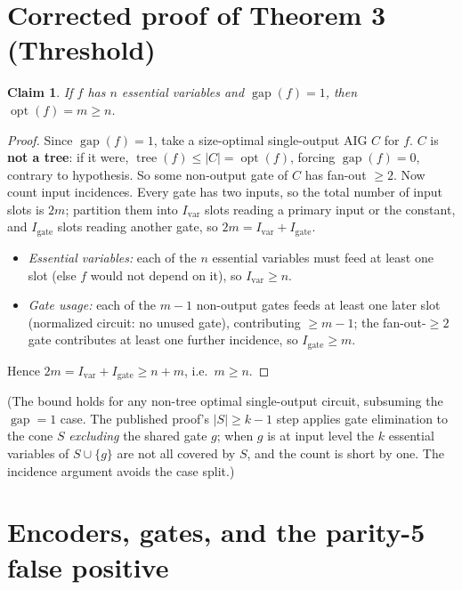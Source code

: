 \documentclass[11pt]{article}
\DeclareMathOperator{\opt}{opt}
\DeclareMathOperator{\tree}{tree}
\DeclareMathOperator{\gapop}{gap}
\theoremstyle{plain}
\newtheorem*{claim}{Claim}
\begin{document}
\nocite{khrapchenko1971,kojevnikov2009,tools}



\appendix

\section{Corrected proof of Theorem 3 (Threshold)}
\label{app:thm3}

\begin{claim}
If $f$ has $n$ essential variables and $\gapop(f) = 1$, then $\opt(f) = m \ge n$.
\end{claim}

\begin{proof}
Since $\gapop(f) = 1$, take a size-optimal single-output AIG $C$ for $f$. $C$ is \textbf{not a
tree}: if it were, $\tree(f) \le |C| = \opt(f)$, forcing $\gapop(f) = 0$, contrary to hypothesis. So
some non-output gate of $C$ has fan-out $\ge 2$. Now count input incidences. Every gate has two
inputs, so the total number of input slots is $2m$; partition them into $I_{\mathrm{var}}$ slots
reading a primary input or the constant, and $I_{\mathrm{gate}}$ slots reading another gate, so
$2m = I_{\mathrm{var}} + I_{\mathrm{gate}}$.

\begin{itemize}
  \item \emph{Essential variables:} each of the $n$ essential variables must feed at least one slot
  (else $f$ would not depend on it), so $I_{\mathrm{var}} \ge n$.
  \item \emph{Gate usage:} each of the $m - 1$ non-output gates feeds at least one later slot
  (normalized circuit: no unused gate), contributing $\ge m - 1$; the fan-out-$\ge 2$ gate
  contributes at least one further incidence, so $I_{\mathrm{gate}} \ge m$.
\end{itemize}

Hence $2m = I_{\mathrm{var}} + I_{\mathrm{gate}} \ge n + m$, i.e.\ $m \ge n$.
\end{proof}

\noindent
(The bound holds for any non-tree optimal single-output circuit, subsuming the $\gapop = 1$ case.
The published proof's $|S| \ge k-1$ step applies gate elimination to the cone $S$ \emph{excluding}
the shared gate $g$; when $g$ is at input level the $k$ essential variables of $S \cup \{g\}$ are
not all covered by $S$, and the count is short by one. The incidence argument avoids the case
split.)

\section{Encoders, gates, and the parity-5 false positive}
\label{app:encoders}
\end{document}
